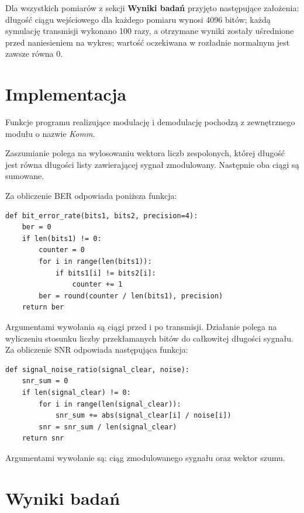 \documentclass{article}
\begin{document}
	Dla wszystkich pomiarów z sekcji \textbf{Wyniki badań} przyjęto następujące założenia: długość ciągu wejściowego dla każdego pomiaru wynosi 4096 bitów; każdą symulację transmisji wykonano 100 razy, a otrzymane wyniki zostały uśrednione przed naniesieniem na wykres; wartość oczekiwana w rozładnie normalnym jest zawsze równa 0.

\section{Implementacja}
	Funkcje programu realizujące modulację i demodulację pochodzą z zewnętrznego modułu o nazwie \textit{Komm}.
	
	\noindent Zaszumianie polega na wylosowaniu wektora liczb zespolonych, której długość jest równa długości listy zawierającej sygnał zmodulowany. Następnie oba ciągi są sumowane.
	
	\noindent Za obliczenie BER odpowiada poniższa funkcja:
	\begin{lstlisting}
def bit_error_rate(bits1, bits2, precision=4):
	ber = 0
	if len(bits1) != 0:
		counter = 0
		for i in range(len(bits1)):
			if bits1[i] != bits2[i]:
				counter += 1
		ber = round(counter / len(bits1), precision)
	return ber
	\end{lstlisting}
	\noindent Argumentami wywołania są ciągi przed i po transmisji. Działanie polega na wyliczeniu stosunku liczby przekłamanych bitów do całkowitej długości sygnału.\\

\newpage
	\noindent Za obliczenie SNR odpowiada następująca funkcja:
	\begin{lstlisting}
def signal_noise_ratio(signal_clear, noise):
	snr_sum = 0
	if len(signal_clear) != 0:
		for i in range(len(signal_clear)):
			snr_sum += abs(signal_clear[i] / noise[i])
		snr = snr_sum / len(signal_clear)
	return snr
	\end{lstlisting}
	\noindent Argumentami wywołanie są: ciąg zmodulowanego sygnału oraz wektor szumu. 

\newpage
\section{Wyniki badań}
\end{document}
